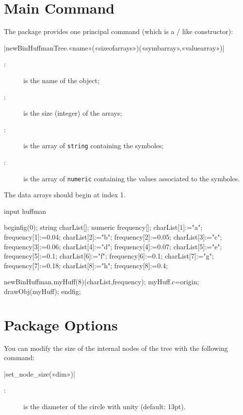 \documentclass[english]{ltxdoc}
\begin{document}
\section{Main Command}

The package \huffman provides one principal command (which is a \MO/ like
constructor):

\commande|newBinHuffmanTree.«name»(«sizeofarrays»)(«symbarray»,«valuearray»)|\smallskip{}


\begin{description}
  \item[:] is the name of the object;
  \item[:] is the size (integer) of the arrays;
  \item[:] is the array of \lstinline+string+ containing the
  symboles;
  \item[:] is the array of \lstinline+numeric+ containing the
  values associated to the symboles.
\end{description}

The data arrays should begin at index 1.  

\begin{ExempleMP}
input huffman

beginfig(0);
string charList[];
numeric frequency[];
charList[1]:="a"; frequency[1]:=0.04;
charList[2]:="b"; frequency[2]:=0.05;
charList[3]:="c"; frequency[3]:=0.06;
charList[4]:="d"; frequency[4]:=0.07;
charList[5]:="e"; frequency[5]:=0.1;
charList[6]:="f"; frequency[6]:=0.1;
charList[7]:="g"; frequency[7]:=0.18;
charList[8]:="h"; frequency[8]:=0.4;

newBinHuffman.myHuff(8)(charList,frequency);
myHuff.c=origin;
drawObj(myHuff);
endfig;
\end{ExempleMP}

\section{Package Options}

You can modify the size of the internal nodes of the tree with the following
command:

\commande|set_node_size(«dim»)|\smallskip{}
\begin{description}
  \item[:] is the diameter of the circle with unity (default: 13pt).
\end{description} 
\end{document}
